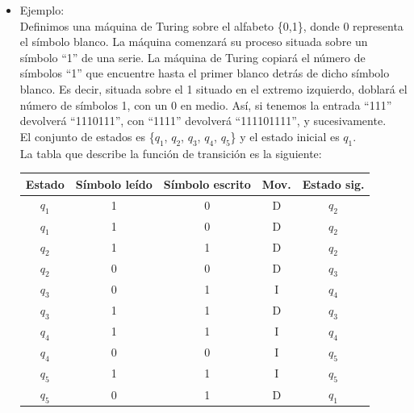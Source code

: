 \documentclass[12pt,a4paper,spanish]{book}
\begin{document}
\begin{itemize}
\item Ejemplo:\\
\newline
Definimos una m\'aquina de Turing sobre el alfabeto \{0,1\}, donde 0 representa el s\'imbolo blanco. La m\'aquina comenzar\'a su proceso situada sobre un s\'imbolo ``1'' de una serie. La m\'aquina de Turing copiar\'a el n\'umero de s\'imbolos ``1'' que encuentre hasta el primer blanco detr\'as de dicho s\'imbolo blanco. Es decir, situada sobre el 1 situado en el extremo izquierdo, doblar\'a el n\'umero de s\'imbolos 1, con un 0 en medio. As\'i, si tenemos la entrada ``111'' devolver\'a ``1110111'', con ``1111'' devolver\'a ``111101111'', y sucesivamente.\\
El conjunto de estados es \{$q_1$, $q_2$, $q_3$, $q_4$, $q_5$\} y el estado inicial es $q_1$.\\
\newline
La tabla que describe la funci\'on de transici\'on es la siguiente:\\
\begin{center}
\begin{tabular}{||c|c|c|c|c||}
\hline
Estado & S\'imbolo le\'ido & S\'imbolo escrito & Mov. & Estado sig. \\
\hline
$q_{1}$ & 1 & 0 & D & $q_{2}$ \\
\hline
$q_{1}$ & 1 & 0 & D & $q_{2}$ \\
\hline
$q_{2}$ & 1 & 1 & D & $q_{2}$ \\
\hline
$q_{2}$ & 0 & 0 & D & $q_{3}$ \\
\hline
$q_{3}$ & 0 & 1 & I & $q_{4}$ \\
\hline
$q_{3}$ & 1 & 1 & D & $q_{3}$ \\
\hline
$q_{4}$ & 1 & 1 & I & $q_{4}$ \\
\hline
$q_{4}$ & 0 & 0 & I & $q_{5}$ \\
\hline
$q_{5}$ & 1 & 1 & I & $q_{5}$ \\
\hline
$q_{5}$ & 0 & 1 & D & $q_{1}$ \\
\hline
\end{tabular}
\end{center}


\end{itemize}
\end{document}
